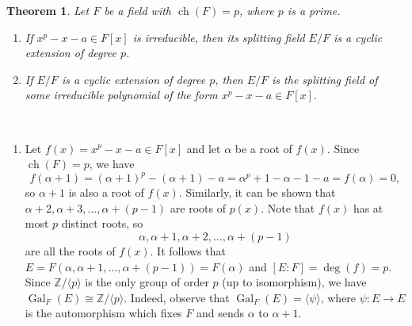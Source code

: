 \documentclass[10pt]{article}
\makeatletter
\newcommand{\Z}{\mathbb{Z}}
\DeclareMathOperator{\ch}{ch}
\DeclareMathOperator{\Gal}{Gal}
\theoremstyle{newstyle}
\newtheorem{thm}{Theorem}[section]
\newenvironment{pf}[1][\proofname]{\par
  \pushQED{\qed}%
  \normalfont \topsep0\p@\relax
  \trivlist
  \item[\hskip\labelsep\scshape
  #1\@addpunct{.}]\ignorespaces
}{%
  \popQED\endtrivlist\@endpefalse
}
\makeatother
\begin{document}
\begin{thm}
Let $F$ be a field with $\ch(F) = p$, where $p$ is a prime. 
\begin{enumerate}[(1)]
    \item If $x^p - x - a \in F[x]$ is irreducible, then its splitting field $E/F$ is a 
    cyclic extension of degree $p$. 
    \item If $E/F$ is a cyclic extension of degree $p$, then $E/F$ is the splitting field 
    of some irreducible polynomial of the form $x^p - x - a \in F[x]$. 
\end{enumerate}
\end{thm}
\begin{pf}~
\begin{enumerate}[(1)]
    \item Let $f(x) = x^p - x - a \in F[x]$ and let $\alpha$ be a root of $f(x)$. Since 
    $\ch(F) = p$, we have 
    \[ f(\alpha+1) = (\alpha+1)^p - (\alpha+1) - a = \alpha^p + 1 - \alpha - 1 - a = f(\alpha) = 0, \]
    so $\alpha+1$ is also a root of $f(x)$. Similarly, it can be shown that 
    $\alpha+2, \alpha+3, \dots, \alpha + (p-1)$ are roots of $p(x)$. Note that 
    $f(x)$ has at most $p$ distinct roots, so 
    \[ \alpha, \alpha+1, \alpha+2, \dots, \alpha + (p-1) \]
    are all the roots of $f(x)$. It follows that 
    $E = F(\alpha, \alpha+1, \dots, \alpha + (p-1)) = F(\alpha)$ and $[E : F] = \deg(f) = p$. 
    Since $\Z/\langle p \rangle$ is the only group of order $p$ (up to isomorphism), 
    we have $\Gal_F(E) \cong \Z/\langle p \rangle$. Indeed, observe that 
    $\Gal_F(E) = \langle \psi \rangle$, where $\psi : E \to E$ is the automorphism which fixes $F$ 
    and sends $\alpha$ to $\alpha+1$. 
    

\end{enumerate}
\end{pf}
\end{document}

